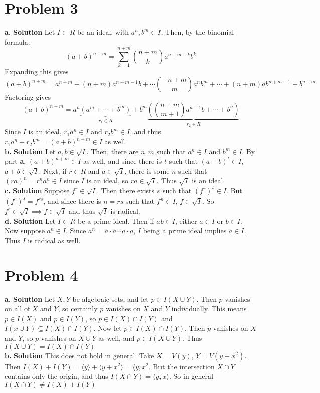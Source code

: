 \documentclass{article}
\begin{document}
\section{Problem 3}
\textbf{a. } \textbf{Solution } Let $I \subset R$ be an ideal, with $a^n, b^m \in I$. Then, by the binomial formula:
\[(a+b)^{n+m} = \sum_{k=1}^{n+m} {n+m \choose k} a^{n+m-k}b^k \] Expanding this gives
\[(a+b)^{n+m} = a^{n+m} + (n+m)a^{n+m-1}b + \cdots {+ n+m \choose m} a^n b^m + \cdots + (n+m)ab^{n+m-1} + b^{n+m} \] Factoring gives
\[(a+b)^{n+m} = a^n \underbrace{\left(a^m + \cdots + b^m\right)}_{r_1 \in R} + b^m \underbrace{\left({n+m \choose m+1}a^{n-1} b + \cdots + b^n \right)}_{r_2 \in R}\]
Since $I$ is an ideal, $r_1 a^n \in I$ and $r_2b^m \in I$, and thus $r_1 a^n + r_2 b^m = (a+b)^{n+m} \in I$ as well. \\
\textbf{b. } \textbf{Solution } Let $a, b \in \sqrt{I}$. Then, there are $n, m$ such that $a^n \in I$ and $b^m \in I$. By part \textbf{a}, $(a+b)^{n+m} \in I$ as well, and since there is $t$ such that
$(a+b)^t \in I$, $a+b \in \sqrt{I}$. Next, if $r \in R$ and $a \in \sqrt{I}$, there is some $n$ such that $(ra)^n = r^n a^n \in I$ since $I$ is an ideal, so $ra \in \sqrt{I}$. Thus $\sqrt{I}$ is an ideal. \\
\textbf{c. } \textbf{Solution } Suppose $f^r \in \sqrt{I}$. Then there exists $s$ such that $(f^r)^s \in I$. But $(f^r)^s = f^{rs}$, and since there is $n = rs$ such that $f^n \in I$, $f \in \sqrt{I}$. So $f^r \in \sqrt{I} \implies f \in \sqrt{I}$ and 
thus $\sqrt{I}$ is radical. \\
\textbf{d. } \textbf{Solution } Let $I \subset R$ be a prime ideal. Then if $ab \in I$, either $a \in I$ or $b \in I$. Now suppose $a^n \in I$. Since $a^n = a \cdot a \cdots a \cdot a$, $I$ being a prime ideal implies $a \in I$. Thus
$I$ is radical as well.

\section{Problem 4}
\textbf{a. } \textbf{Solution } Let $X, Y$ be algebraic sets, and let $p \in I(X \cup Y)$. Then $p$ vanishes on all of $X$ and $Y$, so certainly $p$ vanishes on $X$ and $Y$ individually.
This means $p \in I(X)$ and $p \in I(Y)$, so $p \in I(X) \cap I(Y)$ and $I(x \cup Y) \subseteq I(X) \cap I(Y)$. Now let $p \in I(X) \cap I(Y)$. Then $p$ vanishes on $X$ and $Y$, so $p$ vanishes
on $X \cup Y$ as well, and $p \in I(X \cup Y)$. Thus $I(X \cup Y) = I(X) \cap I(Y)$ \\
\textbf{b. } \textbf{Solution } This does not hold in general. Take $X = V(y)$, $Y = V(y + x^2)$. Then $I(X) + I(Y) = \langle y \rangle + \langle y + x^2 \rangle = \langle y, x^2 $.
But the intersection $X \cap Y$ contains only the origin, and thus $I(X \cap Y) = \langle y, x \rangle$. So in general $I(X \cap Y) \neq I(X) + I(Y)$
\end{document}
